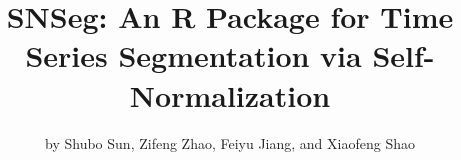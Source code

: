 \title{SNSeg: An R Package for Time Series Segmentation via Self-Normalization}


\author{by Shubo Sun, Zifeng Zhao, Feiyu Jiang, and Xiaofeng Shao}

\maketitle






\address{%
Shubo Sun\\
University of Miami\\%
Herbert Business School\\ Coral Gables, FL, USA\\
%
%
%
\href{mailto:sxs3935@miami.edu}{\nolinkurl{sxs3935@miami.edu}}%
}

\address{%
Zifeng Zhao\\
University of Notre Dame\\%
Mendoza College of Business\\ Notre Dame, IN, USA\\
%
%
%
\href{mailto:zifeng.zhao@nd.edu}{\nolinkurl{zifeng.zhao@nd.edu}}%
}

\address{%
Feiyu Jiang\\
Fudan University\\%
School of Management\\ Shanghai, China\\
%
%
%
\href{mailto:jiangfy@fudan.edu.cn}{\nolinkurl{jiangfy@fudan.edu.cn}}%
}

\address{%
Xiaofeng Shao\\
University of Illinois at Urbana-Champaign\\%
Department of Statistics\\ Champaign, IL, USA\\
%
%
%
\href{mailto:xshao@illinois.edu}{\nolinkurl{xshao@illinois.edu}}%
}
